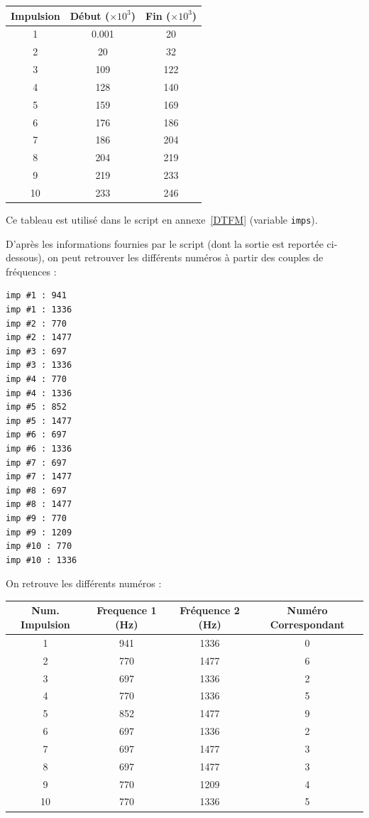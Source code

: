 \documentclass[11pt,a4paper]{article}
\begin{document}
\begin{center}
\begin{tabular}{c||c|c}
Impulsion & Début ($\times 10^3$) & Fin ($\times 10^3$)\\\hline
1 & 0.001 & 20\\
2 & 20 & 32\\
3 & 109 & 122\\
4 & 128 & 140\\
5 & 159 & 169\\
6 & 176 & 186\\
7 & 186 & 204\\
8 & 204 & 219\\
9 & 219 & 233\\
10 & 233 & 246
\end{tabular}
\end{center}

Ce tableau est utilisé dans le script en annexe~\ref{DTFM} (variable \texttt{imps}).

D'après les informations fournies par le script (dont la sortie est reportée ci-dessous), on peut retrouver les
différents numéros à partir des couples de fréquences :

\newpage %

\begin{verbatim}
imp #1 : 941
imp #1 : 1336
imp #2 : 770
imp #2 : 1477
imp #3 : 697
imp #3 : 1336
imp #4 : 770
imp #4 : 1336
imp #5 : 852
imp #5 : 1477
imp #6 : 697
imp #6 : 1336
imp #7 : 697
imp #7 : 1477
imp #8 : 697
imp #8 : 1477
imp #9 : 770
imp #9 : 1209
imp #10 : 770
imp #10 : 1336
\end{verbatim}

On retrouve les différents numéros :

\begin{center}
\begin{tabular}{c|c|c|c}
Num. Impulsion & Frequence 1 (Hz) & Fréquence 2 (Hz) & Numéro Correspondant\\\hline
1 & 941 & 1336 & 0\\
2 & 770 & 1477 & 6\\\hline
3 & 697 & 1336 & 2\\
4 & 770 & 1336 & 5\\\hline
5 & 852 & 1477 & 9\\
6 & 697 & 1336 & 2\\\hline
7 & 697 & 1477 & 3\\
8 & 697 & 1477 & 3\\\hline
9 & 770 & 1209 & 4\\
10 & 770 & 1336 & 5
\end{tabular}
\end{center}
\end{document}
